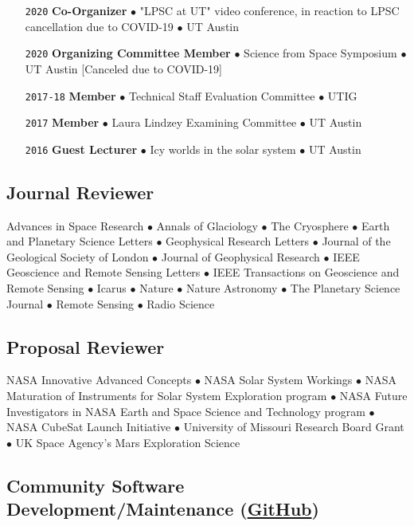 \begin{itemize}[leftmargin=5.8em, labelsep=1.5em]
    \item[\texttt{2020}] \textbf{Co-Organizer} $\bullet$ "LPSC at UT" video conference, in reaction to LPSC cancellation due to COVID-19 $\bullet$ UT Austin
    \item[\texttt{2020}] \textbf{Organizing Committee Member} $\bullet$ Science from Space Symposium $\bullet$ UT Austin [Canceled due to COVID-19]
    \item[\texttt{2017-18}] \textbf{Member} $\bullet$ Technical Staff Evaluation Committee $\bullet$ UTIG
    \item[\texttt{2017}] \textbf{Member} $\bullet$ Laura Lindzey Examining Committee $\bullet$ UT Austin
    \item[\texttt{2016}] \textbf{Guest Lecturer} $\bullet$ Icy worlds in the solar system $\bullet$ UT Austin
\end{itemize}

\vspace{-2em}
\subsection*{Journal Reviewer}

Advances in Space Research $\bullet$ Annals of Glaciology $\bullet$ The Cryosphere $\bullet$ Earth and Planetary Science Letters $\bullet$ Geophysical Research Letters $\bullet$ Journal of the Geological Society of London $\bullet$ Journal of Geophysical Research $\bullet$ IEEE Geoscience and Remote Sensing Letters $\bullet$ IEEE Transactions on Geoscience and Remote Sensing $\bullet$ Icarus $\bullet$ Nature $\bullet$ Nature Astronomy $\bullet$ The Planetary Science Journal $\bullet$ Remote Sensing $\bullet$ Radio Science

\vspace{-1em}
\subsection*{Proposal Reviewer}
 NASA Innovative Advanced Concepts $\bullet$ NASA Solar System Workings $\bullet$ NASA Maturation of Instruments for Solar System Exploration program $\bullet$ NASA Future Investigators in NASA Earth and Space Science and Technology program $\bullet$ NASA CubeSat Launch Initiative $\bullet$ University of Missouri Research Board Grant $\bullet$ UK Space Agency’s Mars Exploration Science

\vspace{-1em}
\subsection*{Community Software Development/Maintenance (\href{https://github.com/cgrima}{GitHub})}
\vspace{-.5em}

